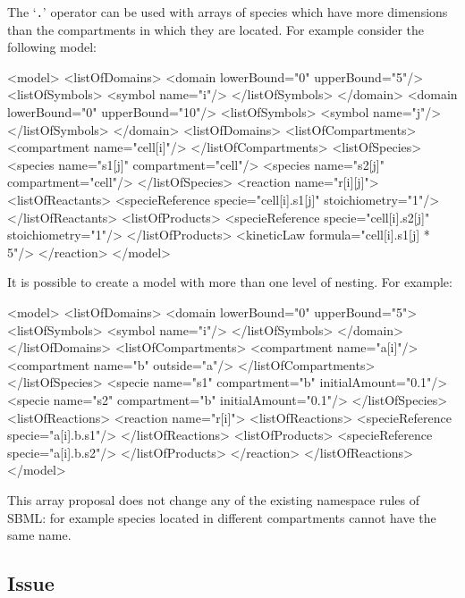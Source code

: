\documentclass{cekarticle}
\begin{document}
The `\texttt{.}' operator can be used with arrays of species which
have more dimensions than the compartments in which they are
located. For example consider the following model:
\begin{example}
<model>
    <listOfDomains>
        <domain lowerBound="0" upperBound="5"/>
            <listOfSymbols>
                <symbol name="i"/>
            </listOfSymbols>
        </domain>
        <domain lowerBound="0" upperBound="10"/>
            <listOfSymbols>
                <symbol name="j"/>
            </listOfSymbols>
        </domain>
    <listOfDomains>
    <listOfCompartments>
        <compartment name="cell[i]"/>
    </listOfCompartments>
    <listOfSpecies>
        <species name="s1[j]" compartment="cell"/>
        <species name="s2[j]" compartment="cell"/>
    </listOfSpecies>
    <reaction name="r[i][j]">
        <listOfReactants>
            <specieReference specie="cell[i].s1[j]" stoichiometry="1"/>
        </listOfReactants>
        <listOfProducts>
            <specieReference specie="cell[i].s2[j]" stoichiometry="1"/>
        </listOfProducts>
        <kineticLaw formula="cell[i].s1[j] * 5"/>
    </reaction>
</model>
\end{example}

It is possible to create a model with more than one level of nesting.
For example:

\begin{example}
<model>
    <listOfDomains>
        <domain lowerBound="0" upperBound="5">
            <listOfSymbols>
                <symbol name="i"/>
            </listOfSymbols>
        </domain>
    </listOfDomains>
    <listOfCompartments>
        <compartment name="a[i]"/>
        <compartment name="b" outside="a"/>
    </listOfCompartments>
    </listOfSpecies>
        <specie name="s1" compartment="b" initialAmount="0.1"/>
        <specie name="s2" compartment="b" initialAmount="0.1"/>
    </listOfSpecies>
    <listOfReactions>
        <reaction name="r[i]">
            <listOfReactions>
                <specieReference specie="a[i].b.s1"/>
            </listOfReactions>
            <listOfProducts>
                <specieReference specie="a[i].b.s2"/>
            </listOfProducts>
        </reaction>
    </listOfReactions>
</model>
\end{example}
This array proposal does not change any of the existing namespace
rules of SBML: for example species located in different compartments cannot
have the same name.

\subsection{Issue}
\end{document}
